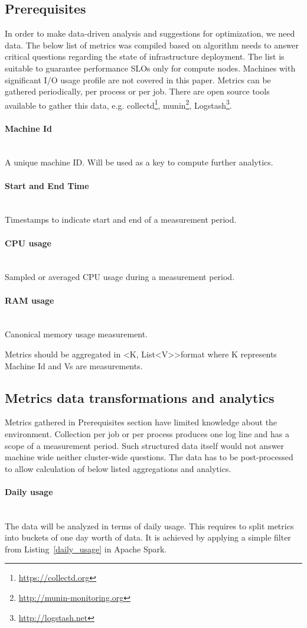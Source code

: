 \documentclass[]{final_report}
\newcommand{\myparagraph}[1]{\paragraph{#1}\mbox{}\\}
\begin{document}
\subsection{Prerequisites} 

In order to make data-driven analysis and suggestions for optimization, we need data. The below list of metrics was compiled based on algorithm needs to answer critical questions regarding the state of infrastructure deployment. The list is suitable to guarantee performance SLOs only for compute nodes. Machines with significant I/O usage profile are not covered in this paper. 
Metrics can be gathered periodically, per process or per job. There are open source tools available to gather this data, e.g. collectd\footnote{\url{https://collectd.org}}, munin\footnote{\url{http://munin-monitoring.org}}, Logstash\footnote{\url{http://logstash.net}}.

\myparagraph{Machine Id}
A unique machine ID. Will be used as a key to compute further analytics.

\myparagraph{Start and End Time}
Timestamps to indicate start and end of a measurement period.

\myparagraph{CPU usage}
Sampled or averaged CPU usage during a measurement period. 

\myparagraph{RAM usage}
Canonical memory usage measurement. 

Metrics should be aggregated in \textless K, List\textless V\textgreater\textgreater format where K represents Machine Id and Vs are measurements. 

\subsection{Metrics data transformations and analytics}

Metrics gathered in Prerequisites section have limited knowledge about the environment. Collection per job or per process produces one log line and has a scope of a measurement period. Such structured data itself would not answer machine wide neither cluster-wide questions. The data has to be post-processed to allow calculation of below listed aggregations and analytics.   

\myparagraph{Daily usage}

The data will be analyzed in terms of daily usage. This requires to split metrics into buckets of one day worth of data. 
It is achieved by applying a simple filter from Listing~\ref{daily_usage} in Apache Spark.
\end{document}
